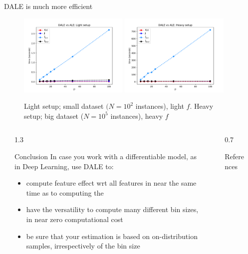 \documentclass[final]{beamer}
\newlength{\sepwidth}
\newlength{\colwidth}
\newcommand{\separatorcolumn}{\begin{column}{\sepwidth}\end{column}}
\begin{document}
\begin{frame}[t]
\begin{columns}[t]
\begin{column}{\colwidth}
			\begin{block}{DALE is much more efficient}
				
        \begin{figure}[ht]
          \centering
          \includegraphics[width=0.49\textwidth]{./../ACML-paper/images/case-1-plot-1.pdf}
          \includegraphics[width=0.49\textwidth]{./../ACML-paper/images/case-1-plot-2.pdf}
          \caption[Case-1-fig-1]{Light setup; small dataset \((N=10^2\) instances), light \(f\). Heavy setup; big dataset (\(N=10^5\) instances), heavy \(f\)}
        \end{figure}
			\end{block}
		\end{column}
		\separatorcolumn
	\end{columns}

	\begin{columns}[t]\separatorcolumn
	\begin{column}{1.3\colwidth}
    \begin{alertblock}{Conclusion}
      In case you work with a differentiable model, as in Deep Learning, use DALE to:
      \begin{itemize}
      \item compute feature effect wrt all features in near the same time as to computing the
      \item have the versatility to compute many different bin sizes, in near zero computational cost
        \item be sure that your estimation is based on on-distribution samples, irrespectively of the bin size
      \end{itemize}
    \end{alertblock}
	\end{column}
  \separatorcolumn
	\begin{column}{0.7\colwidth}
	\begin{block}{References}
				\printbibliography[heading=none]
	\end{block}
\end{column}
\separatorcolumn
\end{columns}

\end{frame}
\end{document}
